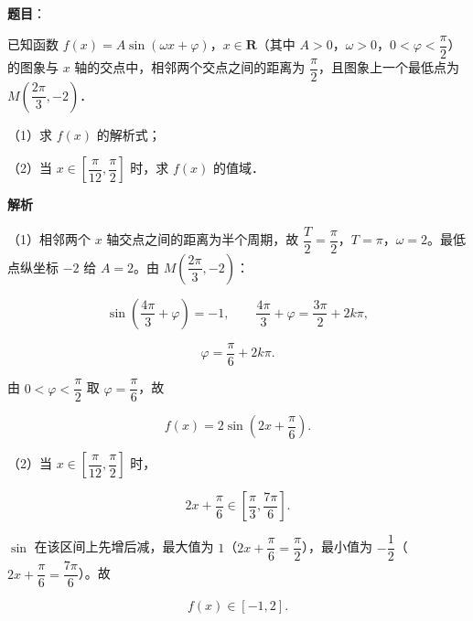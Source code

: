 \begin{answer}

\textbf{题目}：

已知函数 $f(x)=A\sin(\omega x+\varphi)$，$x\in\mathbf R$（其中 $A>0$，$\omega>0$，$0<\varphi<\dfrac\pi2$）的图象与 $x$ 轴的交点中，相邻两个交点之间的距离为 $\dfrac\pi2$，且图象上一个最低点为 $M\left(\dfrac{2\pi}3,-2\right)$．

（1）求 $f(x)$ 的解析式；

（2）当 $x\in\left[\dfrac\pi{12},\dfrac\pi2\right]$ 时，求 $f(x)$ 的值域．

\textbf{解析}

（1）相邻两个 $x$ 轴交点之间的距离为半个周期，故 $\dfrac T2=\dfrac\pi2$，$T=\pi$，$\omega=2$。最低点纵坐标 $-2$ 给 $A=2$。由 $M\left(\dfrac{2\pi}3,-2\right)$：

\nopagebreak[4]
\[\sin\left(\frac{4\pi}3+\varphi\right)=-1,\qquad
\frac{4\pi}3+\varphi=\frac{3\pi}2+2k\pi,\]

\nopagebreak[4]
\[\varphi=\frac\pi6+2k\pi.\]

由 $0<\varphi<\dfrac\pi2$ 取 $\varphi=\dfrac\pi6$，故

\nopagebreak[4]
\[f(x)=2\sin\left(2x+\frac\pi6\right).\]

（2）当 $x\in\left[\dfrac\pi{12},\dfrac\pi2\right]$ 时，

\nopagebreak[4]
\[2x+\frac\pi6\in\left[\frac\pi3,\frac{7\pi}6\right].\]

$\sin$ 在该区间上先增后减，最大值为 $1$（$2x+\dfrac\pi6=\dfrac\pi2$），最小值为 $-\dfrac12$（$2x+\dfrac\pi6=\dfrac{7\pi}6$）。故

\nopagebreak[4]
\[f(x)\in[-1,2].\]


\end{answer}
